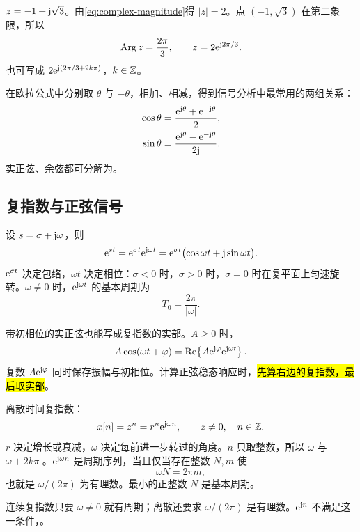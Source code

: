 \begin{example}[代数形式转指数形式]
  $z=-1+\mathrm{j}\sqrt{3}$。由\cref{eq:complex-magnitude}得 $|z|=2$。点 $(-1,\sqrt{3})$ 在第二象限，所以
  \[
    \operatorname{Arg}z=\frac{2\pi}{3},
    \qquad
    z=2\mathrm{e}^{\mathrm{j} 2\pi/3}.
  \]
  也可写成 $2\mathrm{e}^{\mathrm{j}(2\pi/3+2k\pi)}$，$k\in\mathbb{Z}$。
\end{example}

在欧拉公式中分别取 $\theta$ 与 $-\theta$，相加、相减，得到信号分析中最常用的两组关系：
\begin{align}
  \cos\theta
    &=\frac{\mathrm{e}^{\mathrm{j}\theta}+\mathrm{e}^{-\mathrm{j}\theta}}{2},
  \label{eq:cos-complex-exponential}\\
  \sin\theta
    &=\frac{\mathrm{e}^{\mathrm{j}\theta}-\mathrm{e}^{-\mathrm{j}\theta}}{2\mathrm{j}}.
  \label{eq:sin-complex-exponential}
\end{align}
实正弦、余弦都可分解为。

\subsection{复指数与正弦信号}

设 $s=\sigma+\mathrm{j}\omega$，则
\begin{equation}
  \mathrm{e}^{st}=\mathrm{e}^{\sigma t}\mathrm{e}^{\mathrm{j}\omega t}
  =\mathrm{e}^{\sigma t}\bigl(\cos\omega t+\mathrm{j}\sin\omega t\bigr).
  \label{eq:complex-exponential-signal}
\end{equation}
$\mathrm{e}^{\sigma t}$ 决定包络，$\omega t$ 决定相位：$\sigma<0$ 时，$\sigma>0$ 时，$\sigma=0$ 时在复平面上匀速旋转。$\omega\ne0$ 时，$\mathrm{e}^{\mathrm{j}\omega t}$ 的基本周期为
\[
  T_0=\frac{2\pi}{|\omega|}.
\]

带初相位的实正弦也能写成复指数的实部。$A\geq0$ 时，
\begin{equation}
  A\cos(\omega t+\varphi)
  =\operatorname{Re}\!\left\{A\mathrm{e}^{\mathrm{j}\varphi}\mathrm{e}^{\mathrm{j}\omega t}\right\}.
  \label{eq:sinusoid-complex-form}
\end{equation}
复数 $A\mathrm{e}^{\mathrm{j}\varphi}$ 同时保存振幅与初相位。计算正弦稳态响应时，\hl{先算右边的复指数，最后取实部}。

离散时间复指数：
\[
  x[n]=z^n=r^n\mathrm{e}^{\mathrm{j}\omega n},\qquad z\ne0,\quad n\in\mathbb{Z}.
\]
$r$ 决定增长或衰减，$\omega$ 决定每前进一步转过的角度。$n$ 只取整数，所以 $\omega$ 与 $\omega+2k\pi$ 。$\mathrm{e}^{\mathrm{j}\omega n}$ 是周期序列，当且仅当存在整数 $N,m$ 使
\[
  \omega N=2\pi m,
\]
也就是 $\omega/(2\pi)$ 为有理数。最小的正整数 $N$ 是基本周期。

\begin{pitfall}[把连续时间的周期公式直接搬过来]
  连续复指数只要 $\omega\ne0$ 就有周期；离散还要求 $\omega/(2\pi)$ 是有理数。$\mathrm{e}^{\mathrm{j} n}$ 不满足这一条件，。
\end{pitfall}

